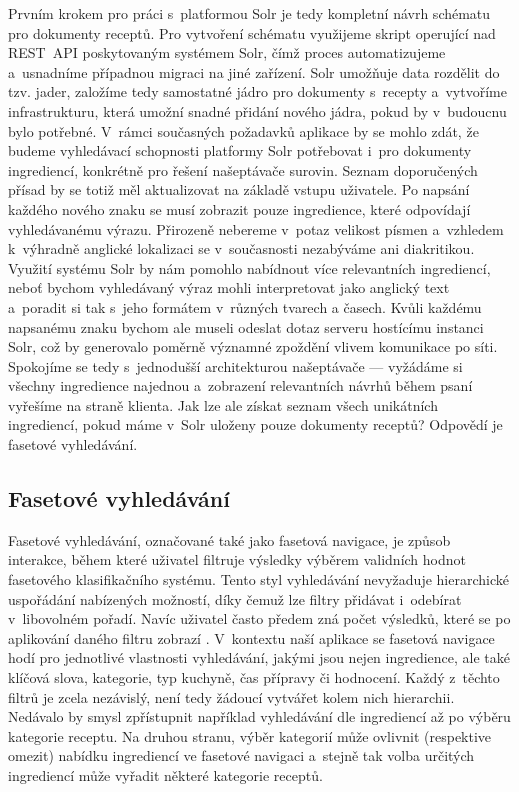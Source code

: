 Prvním krokem pro práci s~platformou Solr je tedy kompletní návrh schématu pro dokumenty receptů. Pro vytvoření schématu využijeme skript operující nad REST~API poskytovaným systémem Solr, čímž proces automatizujeme a~usnadníme případnou migraci na jiné zařízení. Solr umožňuje data rozdělit do tzv. jader, založíme tedy samostatné jádro pro dokumenty s~recepty a~vytvoříme infrastrukturu, která umožní snadné přidání nového jádra, pokud by v~budoucnu bylo potřebné. V~rámci současných požadavků aplikace by se mohlo zdát, že budeme vyhledávací schopnosti platformy Solr potřebovat i~pro dokumenty ingrediencí, konkrétně pro řešení našeptávače surovin. Seznam doporučených přísad by se totiž měl aktualizovat na základě vstupu uživatele. Po napsání každého nového znaku se musí zobrazit pouze ingredience, které odpovídají vyhledávanému výrazu. Přirozeně nebereme v~potaz velikost písmen a~vzhledem k~výhradně anglické lokalizaci se v~současnosti nezabýváme ani diakritikou. Využití systému Solr by nám pomohlo nabídnout více relevantních ingrediencí, neboť bychom vyhledávaný výraz mohli interpretovat jako anglický text a~poradit si tak s~jeho formátem v~různých tvarech a časech. Kvůli každému napsanému znaku bychom ale museli odeslat dotaz serveru hostícímu instanci Solr, což by generovalo poměrně významné zpoždění vlivem komunikace po síti. Spokojíme se tedy s~jednodušší architekturou našeptávače --- vyžádáme si všechny ingredience najednou a~zobrazení relevantních návrhů během psaní vyřešíme na straně klienta. Jak lze ale získat seznam všech unikátních ingrediencí, pokud máme v~Solr uloženy pouze dokumenty receptů? Odpovědí je fasetové vyhledávání.

\subsection{Fasetové vyhledávání}

Fasetové vyhledávání, označované také jako fasetová navigace, je způsob interakce, během které uživatel filtruje výsledky výběrem validních hodnot fasetového klasifikačního systému. Tento styl vyhledávání nevyžaduje hierarchické uspořádání nabízených možností, díky čemuž lze filtry přidávat i~odebírat v~libovolném pořadí. Navíc uživatel často předem zná počet výsledků, které se po aplikování daného filtru zobrazí \citep{faceted-search}. V~kontextu naší aplikace se fasetová navigace hodí pro jednotlivé vlastnosti vyhledávání, jakými jsou nejen ingredience, ale také klíčová slova, kategorie, typ kuchyně, čas přípravy či hodnocení. Každý z~těchto filtrů je zcela nezávislý, není tedy žádoucí vytvářet kolem nich hierarchii. Nedávalo by smysl zpřístupnit například vyhledávání dle ingrediencí až po výběru kategorie receptu. Na druhou stranu, výběr kategorií může ovlivnit (respektive omezit) nabídku ingrediencí ve fasetové navigaci a~stejně tak volba určitých ingrediencí může vyřadit některé kategorie receptů.

